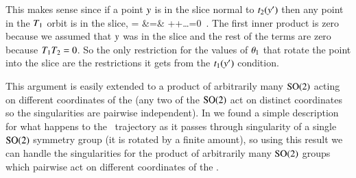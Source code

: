 This makes sense since if a point $y$ is in the slice normal to
$t_2({y'})$ then any point in the $T_1$ orbit is in the
slice,
\bea
{}
=
    \continue
&=& ++\ldots=0
\,.
\nnu
\eea
The first inner product is zero because we assumed that $y$ was in the slice and the rest of the terms are zero because $T_1 T_2=0$. So the only restriction for the values of ${\bf \theta}_1$ that rotate the point into the slice are the restrictions it gets from the $t_1({y'})$ condition.

This argument is easily extended to a product of arbitrarily many
$\textrm{SO}(2)$ acting on different coordinates of the {\statesp} (any two of
the $\textrm{SO}(2)$ act on distinct coordinates so the singularities are
pairwise independent). In  we found a simple
description for what happens to the \reducedsp\ trajectory as it passes
through singularity of a single $\textrm{SO}(2)$ symmetry group (it is rotated
by a finite amount), so using this result we can handle the singularities
for the product of arbitrarily many $\textrm{SO}(2)$ groups which pairwise act
on different coordinates of the {\statesp}.
